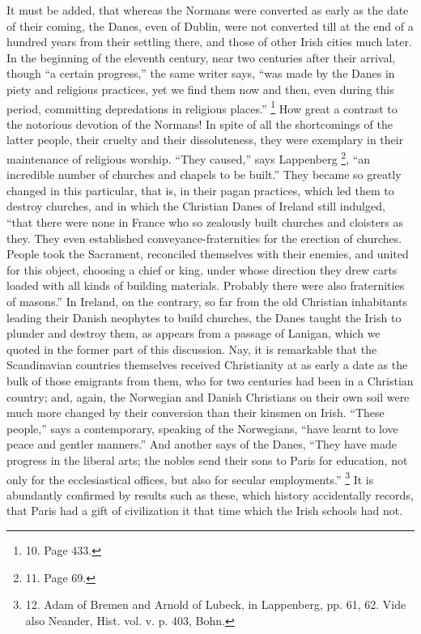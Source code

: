 It must be added, that whereas
the Normans were converted as early as the date of their coming, the
Danes, even of Dublin, were not converted till at the end of a hundred
years from their settling there, and those of other Irish cities much
later. In the beginning of the eleventh century, near two centuries
after their arrival, though ``a certain progress,'' the same writer
says, ``was made by the Danes in piety and religious practices, yet we
find them now and then, even during this period, committing
depredations in religious places.'' \footnote{10.
Page 433.} How great a contrast to the notorious devotion of the Normans!
In spite of all the shortcomings of the latter people, their cruelty
and their dissoluteness, they were exemplary in their maintenance of
religious worship. ``They caused,'' says Lappenberg \footnote{11.
Page 69.}, ``an incredible number of churches and chapels to be built.''
They became so greatly changed in this particular, that is, in their
pagan practices, which led them to destroy churches, and in which the
Christian Danes of Ireland still indulged, ``that there were none in
France who so zealously built churches and cloisters as they. They
even established conveyance-fraternities for the erection of churches.
People took the Sacrament, reconciled themselves with their
enemies, and united for this object, choosing a chief or king, under
whose direction they drew carts loaded with all kinds of building
materials. Probably there were also fraternities of masons.'' In
Ireland, on the contrary, so far from the old Christian inhabitants
leading their Danish neophytes to build churches, the Danes taught the
Irish to plunder and destroy them, as appears from a passage of
Lanigan, which we quoted in the former part of this discussion. Nay,
it is remarkable that the Scandinavian countries themselves received
Christianity at as early a date as the bulk of those emigrants from
them, who for two centuries had been in a Christian country; and,
again, the Norwegian and Danish Christians on their own soil were much
more changed by their conversion than their kinsmen on Irish. ``These
people,'' says a contemporary, speaking of the Norwegians, ``have learnt
to love peace and gentler manners.'' And another says of the Danes, ``They
have made progress in the liberal arts; the nobles send their sons to
Paris for education, not only for the ecclesiastical offices, but also
for secular employments.'' \footnote{12.
Adam of Bremen and Arnold of Lubeck, in Lappenberg, pp. 61, 62. Vide
also Neander, Hist. vol. v. p. 403, Bohn.}
It is abundantly confirmed by results such as these, which history
accidentally records, that Paris had a gift of civilization it that
time which the Irish schools had not.

